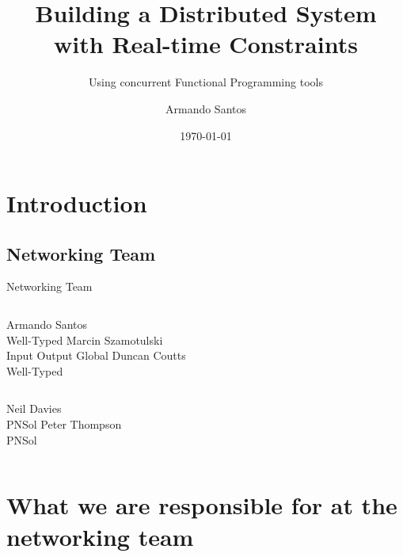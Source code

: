 \documentclass{beamer}
\begin{document}
\title{Building a Distributed System with Real-time Constraints}
\subtitle{Using concurrent Functional Programming tools}
\author{Armando Santos}
\date{\today}
\maketitle


\section{Introduction}
\subsection*{Networking Team}
\begin{frame}{Networking Team}
  \begin{columns}
    \centering
    Armando Santos \\ Well-Typed
    \centering
    Marcin Szamotulski \\ Input Output Global
    \centering
    Duncan Coutts \\ Well-Typed
  \end{columns}
  \vskip1cm
  \begin{columns}
    \centering
    Neil Davies \\ PNSol
    \centering
    Peter Thompson \\ PNSol
  \end{columns}
\end{frame}

\section{What we are responsible for at the networking team}
\end{document}

